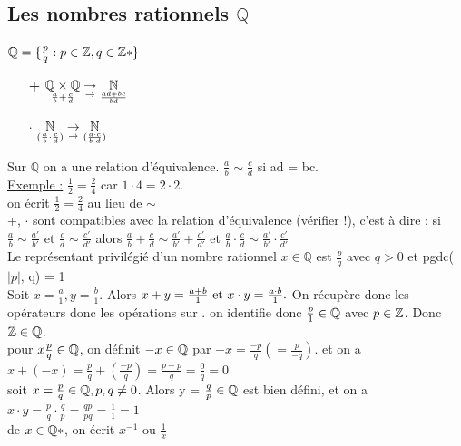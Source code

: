 \documentclass[12pt,a4paper]{article}
\begin{document}
\subsection{Les nombres rationnels $\mathbb{Q}$}
$\mathbb{Q} = \{\frac{p}{q} : p \in  \mathbb{Z}, q \in \mathbb{Z}*\}$
\begin{itemize}
	\item[\textbf{+}] $\underset{\frac{a}{b} + \frac{c}{d}}{\mathbb{Q}\times\mathbb{Q}} \underset{\to}{\to} \underset{\frac{ad + bc}{bd}}{\mathbb{N}}$	 
	\item[\textbf{$\cdot$}] $\underset{(\frac{a}{b} \cdot \frac{c}{d})}{\mathbb{N}} \underset{\to}{\to} \underset{(\frac{a\cdot c}{b\cdot d})}{\mathbb{N}}$	 
\end{itemize}
Sur $\mathbb{Q}$ on a une relation d'équivalence. $\frac{a}{b} \sim \frac{c}{d}$ si ad = bc.\\
\underline{Exemple :} $\frac{1}{2} = \frac{2}{4}$ car $1 \cdot 4  = 2 \cdot 2$.\\
 on écrit $\frac{1}{2} = \frac{2}{4}$ au lieu de $\sim$\\
 +, $\cdot$ sont compatibles avec la relation d'équivalence (vérifier !), c'est à dire : si $\frac{a}{b} \sim \frac{a'}{b'}$ et $\frac{c}{d} \sim \frac{c'}{d'}$ alors $\frac{a}{b} + \frac{c}{d} \sim \frac{a'}{b'} + \frac{c'}{d'}$ et $\frac{a}{b} \cdot \frac{c}{d} \sim \frac{a'}{b'} \cdot \frac{c'}{d'}$\\
Le représentant privilégié d'un nombre rationnel $x \in \mathbb{Q}$ est $\frac{p}{q}$ avec $q > 0$ et pgdc($|p|$, q) = 1\\
Soit $x = \frac{a}{1}, y =  \frac{b}{1}.$ Alors $x+y = \frac{a+b}{1} \mbox{ et } x\cdot y = \frac{a\cdot b}{1}.$ On récupère donc les opérateurs donc les opérations sur \Z. on identifie donc $\frac{p}{1} \in \mathbb{Q}$ avec $p \in \mathbb{Z}$. Donc $\mathbb{Z} \in \mathbb{Q}$.\\
 pour $x\frac{p}{q} \in  \mathbb{Q}$, on définit $-x \in \mathbb{Q}$ par $-x = \frac{-p}{q} (= \frac{p}{-q})$. et on a $x + (-x) = \frac{p}{q} + (\frac{-p}{q}) = \frac{p-p}{q} = \frac{0}{q} = 0$\\
 soit $x = \frac{p}{q} \in \mathbb{Q}, p, q \neq 0$. Alors y = $\frac{q}{p} \in \mathbb{Q}$ est bien défini, et on a $x \cdot y = \frac{p}{q} \cdot \frac{q}{p} = \frac{qp}{pq} = \frac{1}{1} = 1$\\
 de $x \in \mathbb{Q}*$, on écrit $x^{-1}$ ou $\frac{1}{x}$
\end{document}
